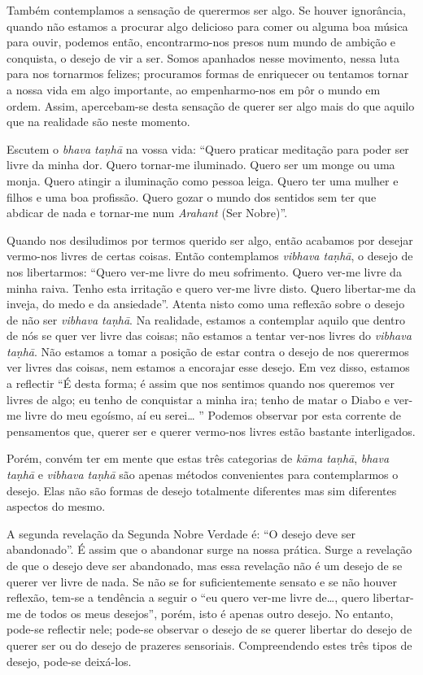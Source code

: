 Também contemplamos a sensação de querermos ser algo. Se houver ignorância,
quando não estamos a procurar algo delicioso para comer ou alguma boa música
para ouvir, podemos então, encontrarmo-nos presos num mundo de ambição e
conquista, o desejo de vir a ser. Somos apanhados nesse movimento, nessa luta
para nos tornarmos felizes; procuramos formas de enriquecer ou tentamos tornar a
nossa vida em algo importante, ao empenharmo-nos em pôr o mundo em ordem. Assim,
apercebam-se desta sensação de querer ser algo mais do que aquilo que na
realidade são neste momento.

Escutem o \emph{bhava taṇhā} na vossa vida: “Quero praticar meditação para poder
ser livre da minha dor. Quero tornar-me iluminado. Quero ser um monge ou uma
monja. Quero atingir a iluminação como pessoa leiga. Quero ter uma mulher e
filhos e uma boa profissão. Quero gozar o mundo dos sentidos sem ter que abdicar
de nada e tornar-me num \emph{Arahant} (Ser Nobre)”.

Quando nos desiludimos por termos querido ser algo, então acabamos por desejar
vermo-nos livres de certas coisas. Então contemplamos \emph{vibhava taṇhā}, o
desejo de nos libertarmos: “Quero ver-me livre do meu sofrimento. Quero ver-me
livre da minha raiva. Tenho esta irritação e quero ver-me livre disto. Quero
libertar-me da inveja, do medo e da ansiedade”. Atenta nisto como uma reflexão
sobre o desejo de não ser \emph{vibhava taṇhā}. Na realidade, estamos a
contemplar aquilo que dentro de nós se quer ver livre das coisas; não estamos a
tentar ver-nos livres do \emph{vibhava taṇhā}. Não estamos a tomar a posição de
estar contra o desejo de nos querermos ver livres das coisas, nem estamos a
encorajar esse desejo. Em vez disso, estamos a reflectir “É desta forma; é assim
que nos sentimos quando nos queremos ver livres de algo; eu tenho de conquistar
a minha ira; tenho de matar o Diabo e ver-me livre do meu egoísmo, aí eu
serei\ldots{} ” Podemos observar por esta corrente de pensamentos que, querer ser e
querer vermo-nos livres estão bastante interligados.

Porém, convém ter em mente que estas três categorias de \emph{kāma taṇhā},
\emph{bhava taṇhā} e \emph{vibhava taṇhā} são apenas métodos convenientes para
contemplarmos o desejo. Elas não são formas de desejo totalmente diferentes mas
sim diferentes aspectos do mesmo.

A segunda revelação da Segunda Nobre Verdade é: “O desejo deve ser abandonado”.
É assim que o abandonar surge na nossa prática. Surge a revelação de que o
desejo deve ser abandonado, mas essa revelação não é um desejo de se querer ver
livre de nada. Se não se for suficientemente sensato e se não houver reflexão,
tem-se a tendência a seguir o “eu quero ver-me livre de\ldots{}, quero
libertar-me de todos os meus desejos”, porém, isto é apenas outro desejo. No
entanto, pode-se reflectir nele; pode-se observar o desejo de se querer libertar
do desejo de querer ser ou do desejo de prazeres sensoriais. Compreendendo estes
três tipos de desejo, pode-se deixá-los.

